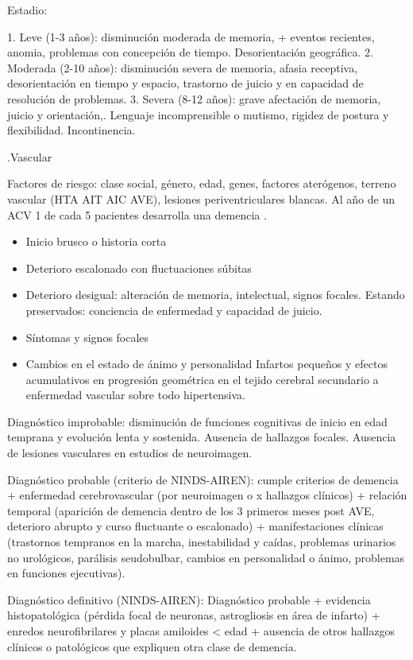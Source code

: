 Estadio:

1. Leve (1-3 años): disminución moderada de memoria, + eventos recientes, anomia, problemas con concepción de tiempo. Desorientación geográfica.
2. Moderada (2-10 años): disminución severa de memoria, afasia receptiva, desorientación en tiempo y espacio, trastorno de juicio y en capacidad de resolución de problemas.
3. Severa (8-12 años): grave afectación de memoria, juicio y orientación,. Lenguaje incomprensible o mutismo, rigidez de postura y flexibilidad. Incontinencia.

.Vascular

Factores de riesgo: clase social, género, edad, genes, factores aterógenos, terreno vascular (HTA AIT AIC AVE), lesiones periventriculares blancas. Al año de un ACV 1 de cada 5 pacientes desarrolla una demencia \cite{craig2022prevalence}.

\begin{itemize}
	\item Inicio brusco o historia corta
	\item Deterioro escalonado con fluctuaciones súbitas
	\item Deterioro desigual: alteración de memoria, intelectual, signos focales. Estando preservados: conciencia de enfermedad y capacidad de juicio.
	\item Síntomas y signos focales
	\item Cambios en el estado de ánimo y personalidad Infartos pequeños y efectos acumulativos en progresión geométrica en el tejido cerebral secundario a enfermedad vascular sobre todo hipertensiva.
\end{itemize}

Diagnóstico improbable: disminución de funciones cognitivas de inicio en edad temprana y evolución lenta y sostenida. Ausencia de hallazgos focales. Ausencia de lesiones vasculares en estudios de neuroimagen.

Diagnóstico probable (criterio de NINDS-AIREN): cumple criterios de demencia + enfermedad cerebrovascular (por neuroimagen o x hallazgos clínicos) + relación temporal (aparición de demencia dentro de los 3 primeros meses post AVE, deterioro abrupto y curso fluctuante o escalonado) + manifestaciones clínicas (trastornos tempranos en la marcha, inestabilidad y caídas, problemas urinarios no urológicos, parálisis seudobulbar, cambios en personalidad o ánimo, problemas en funciones ejecutivas).

Diagnóstico definitivo (NINDS-AIREN): Diagnóstico probable + evidencia histopatológica (pérdida focal de neuronas, astrogliosis en área de infarto) + enredos neurofibrilares y placas amiloides < edad + ausencia de otros hallazgos clínicos o patológicos que expliquen otra clase de demencia.

